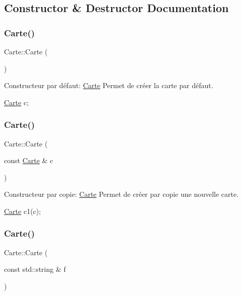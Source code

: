 \subsection{Constructor \& Destructor Documentation}
\mbox{\label{classCarte_a06daaca86c31c80f8308f4a81d46dc9b}} 
\subsubsection{\texorpdfstring{Carte()}{Carte()}\hspace{0.1cm}{\footnotesize\ttfamily [1/3]}}
{\footnotesize\ttfamily Carte\+::\+Carte (\begin{DoxyParamCaption}{ }\end{DoxyParamCaption})}



Constructeur par défaut\+: \hyperlink{classCarte}{Carte} Permet de créer la carte par défaut. 


\begin{DoxyCode}
\hyperlink{classCarte}{Carte} c;
\end{DoxyCode}
 \mbox{\label{classCarte_afe56c0ec89cb3cf0332755204b576a2d}} 
\subsubsection{\texorpdfstring{Carte()}{Carte()}\hspace{0.1cm}{\footnotesize\ttfamily [2/3]}}
{\footnotesize\ttfamily Carte\+::\+Carte (\begin{DoxyParamCaption}\item[{const \hyperlink{classCarte}{Carte} \&}]{c }\end{DoxyParamCaption})}



Constructeur par copie\+: \hyperlink{classCarte}{Carte} Permet de créer par copie une nouvelle carte. 


\begin{DoxyCode}
\hyperlink{classCarte}{Carte} c1(c);
\end{DoxyCode}
 \mbox{\label{classCarte_acf6679e07683a19586bd9dc0f699d8b4}} 
\subsubsection{\texorpdfstring{Carte()}{Carte()}\hspace{0.1cm}{\footnotesize\ttfamily [3/3]}}
{\footnotesize\ttfamily Carte\+::\+Carte (\begin{DoxyParamCaption}\item[{const std\+::string \&}]{f }\end{DoxyParamCaption})}



